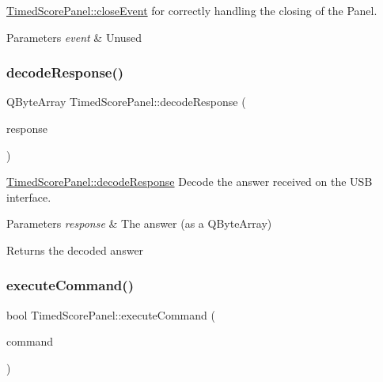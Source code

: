 \mbox{\hyperlink{classTimedScorePanel_a04915c8a5ff6d471bc855d57fc7ac23b}{Timed\+Score\+Panel\+::close\+Event}} for correctly handling the closing of the Panel. 


\begin{DoxyParams}{Parameters}
{\em event} & Unused \\
\hline
\end{DoxyParams}
\mbox{\label{classTimedScorePanel_aa4af54da0ec58b24e4e36812c90de9b8}} 
\subsubsection{\texorpdfstring{decode\+Response()}{decodeResponse()}}
{\footnotesize\ttfamily Q\+Byte\+Array Timed\+Score\+Panel\+::decode\+Response (\begin{DoxyParamCaption}\item[{Q\+Byte\+Array}]{response }\end{DoxyParamCaption})\hspace{0.3cm}{\ttfamily [protected]}}



\mbox{\hyperlink{classTimedScorePanel_aa4af54da0ec58b24e4e36812c90de9b8}{Timed\+Score\+Panel\+::decode\+Response}} Decode the answer received on the U\+SB interface. 


\begin{DoxyParams}{Parameters}
{\em response} & The answer (as a Q\+Byte\+Array) \\
\hline
\end{DoxyParams}
\begin{DoxyReturn}{Returns}
the decoded answer 
\end{DoxyReturn}
\mbox{\label{classTimedScorePanel_a0b1e7a7596b1e059571c65ce6046c343}} 
\subsubsection{\texorpdfstring{execute\+Command()}{executeCommand()}}
{\footnotesize\ttfamily bool Timed\+Score\+Panel\+::execute\+Command (\begin{DoxyParamCaption}\item[{Q\+Byte\+Array}]{command }\end{DoxyParamCaption})\hspace{0.3cm}{\ttfamily [protected]}}



